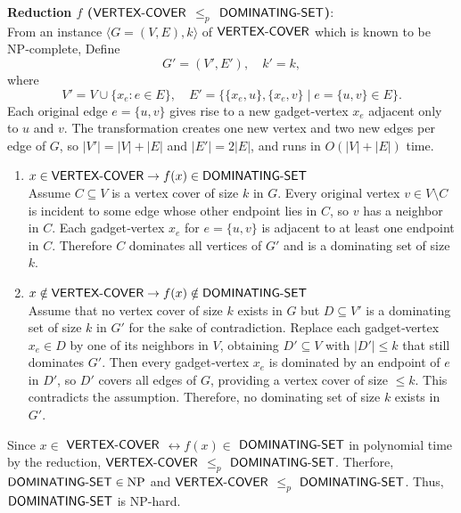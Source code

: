 \begin{enumerate}
\begin{itemize}
\begin{subprove}
        \textbf{Reduction $f$ ($\textsf{VERTEX-COVER}$ $\leq_p$ $\textsf{DOMINATING-SET}$)}: \\
        From an instance 
        \(\langle G=(V,E),k\rangle\) of \(\textsf{VERTEX-COVER}\) which is known to be NP‐complete, 
        Define
        \[
            G'=(V',E'),\quad k'=k,
        \]
        where
        \[
            V' = V \cup \{x_e : e\in E\},\quad
            E' = \{\{x_e,u\},\{x_e,v\}\mid e=\{u,v\}\in E\}.
        \]
        Each original edge \(e=\{u,v\}\) gives rise to a new 
        gadget‑vertex \(x_e\) adjacent only to \(u\) and \(v\).
        The transformation creates one new vertex and two new 
        edges per edge of \(G\), so 
        \(\lvert V'\rvert = \lvert V\rvert + \lvert E\rvert\) 
        and \(\lvert E'\rvert = 2\lvert E\rvert\), and runs in 
        \(O(\lvert V\rvert + \lvert E\rvert)\) time.
        \begin{enumerate}
            \item \textbf{$x\in \textsf{VERTEX-COVER} \rightarrow f(x)\in\textsf{DOMINATING-SET}$}\\
            Assume \(C\subseteq V\) is a vertex cover of size \(k\) in \(G\). 
            Every original vertex \(v\in V\setminus C\) is incident to some 
            edge whose other endpoint lies in \(C\), so \(v\) has a neighbor 
            in \(C\).  Each gadget‑vertex \(x_e\) for \(e=\{u,v\}\) is adjacent 
            to at least one endpoint in \(C\).  Therefore \(C\) dominates all 
            vertices of \(G'\) and is a dominating set of size \(k\).
            \item \textbf{$x\notin \textsf{VERTEX-COVER} \rightarrow f(x)\notin\textsf{DOMINATING-SET}$}\\
            Assume that no vertex cover of size 
            \(k\) exists in \(G\) but \(D\subseteq V'\) is a dominating set of 
            size \(k\) in \(G'\)
            for the sake of contradiction. Replace each gadget‑vertex \(x_e\in D\) by 
            one of its neighbors in \(V\), obtaining \(D'\subseteq V\) with 
            \(\lvert D'\rvert\le k\) that still dominates \(G'\).  Then every 
            gadget‑vertex \(x_e\) is dominated by an endpoint of \(e\) 
            in \(D'\), so \(D'\) covers all edges of \(G\), providing a 
            vertex cover of size \(\le k\).  
            This contradicts the assumption.  Therefore, no dominating 
            set of size \(k\) exists in \(G'\).
        \end{enumerate}
        Since $x \in$ $\textsf{VERTEX-COVER}$ $\leftrightarrow f(x) \in$ $\textsf{DOMINATING-SET}$ 
        in polynomial time by the reduction, 
        $\textsf{VERTEX-COVER}$ $\leq_p$ $\textsf{DOMINATING-SET}$. 
        Therfore, \(\textsf{DOMINATING-SET}\in\mathrm{NP}\) and 
        $\textsf{VERTEX-COVER}$ $\leq_p$ $\textsf{DOMINATING-SET}$.
        Thus, $\textsf{DOMINATING-SET}$ is NP-hard.
        \end{subprove}




\end{itemize}
\end{enumerate}

